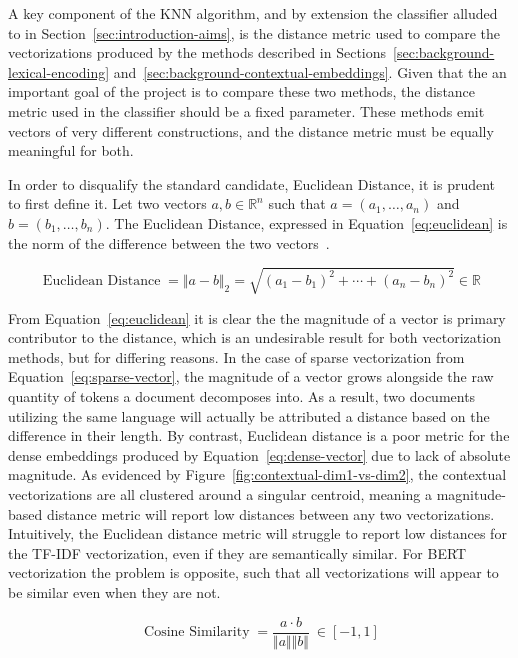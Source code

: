 \documentclass[11pt]{article}
\theoremstyle{plain}
\theoremstyle{definition}
\begin{document}
A key component of the KNN algorithm, and by extension the classifier alluded to in Section~\ref{sec:introduction-aims}, is the distance metric used to compare the vectorizations produced by the methods described in Sections~\ref{sec:background-lexical-encoding} and~\ref{sec:background-contextual-embeddings}. Given that the an important goal of the project is to compare these two methods, the distance metric used in the classifier should be a fixed parameter. These methods emit vectors of very different constructions, and the distance metric must be equally meaningful for both.

In order to disqualify the standard candidate, Euclidean Distance, it is prudent to first define it. Let two vectors $a, b \in \mathbb{R}^{n}$ such that $a = (a_1, \dots, a_n)$ and $b = (b_1, \dots, b_n)$. The Euclidean Distance, expressed in Equation~\ref{eq:euclidean} is the norm of the difference between the two vectors~\cite{lay/2021/linear}.

\begin{equation}\label{eq:euclidean}
    \operatorname{Euclidean\ Distance} = {\Vert a-b \Vert}_2 = \sqrt{{(a_1-b_1)}^2 + \cdots + {(a_n - b_n)}^2} \in \mathbb{R}
\end{equation}

From Equation~\ref{eq:euclidean} it is clear the the magnitude of a vector is primary contributor to the distance, which is an undesirable result for both vectorization methods, but for differing reasons. In the case of sparse vectorization from Equation~\ref{eq:sparse-vector}, the magnitude of a vector grows alongside the raw quantity of tokens a document decomposes into. As a result, two documents utilizing the same language will actually be attributed a distance based on the difference in their length. By contrast, Euclidean distance is a poor metric for the dense embeddings produced by Equation~\ref{eq:dense-vector} due to lack of absolute magnitude. As evidenced by Figure~\ref{fig:contextual-dim1-vs-dim2}, the contextual vectorizations are all clustered around a singular centroid, meaning a magnitude-based distance metric will report low distances between any two vectorizations. Intuitively, the Euclidean distance metric will struggle to report low distances for the TF-IDF vectorization, even if they are semantically similar. For BERT vectorization the problem is opposite, such that all vectorizations will appear to be similar even when they are not.

\begin{equation}\label{eq:cosine-similarity}
    \operatorname{Cosine\ Similarity} = \frac{a \cdot b}{\Vert a \Vert \Vert b \Vert}\ \in [-1, 1]
\end{equation}
\end{document}
